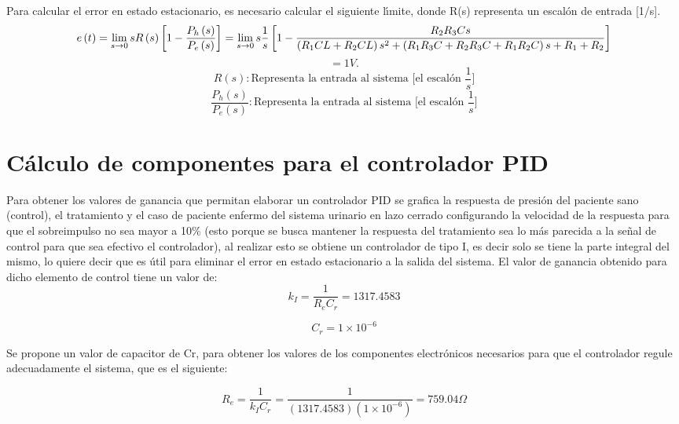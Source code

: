 \documentclass[letterpaper,11pt]{article}
\begin{document}
Para calcular el error en estado estacionario, es necesario calcular el
siguiente l\'{\i}mite, donde R(s) representa un escal\'{o}n de entrada [1/s].%
\begin{equation*}
e\left( t\right) =\lim_{s\rightarrow 0}sR\left( s\right) \left[ 1-\dfrac{%
P_{h}\left( s\right) }{P_{e}\left( s\right) }\right] =\lim_{s\rightarrow 0}s%
\frac{1}{s}\left[ 1-\frac{R_{2}R_{3}Cs}{\left( R_{1}CL+R_{2}CL\right)
s^{2}+\left( R_{1}R_{3}C+R_{2}R_{3}C+R_{1}R_{2}C\right) s+R_{1}+R_{2}}\right]
\end{equation*}%
\begin{equation*}
=1V.
\end{equation*}%
\begin{equation*}
R(s):\text{Representa la entrada al sistema [el escal\'{o}n }\frac{1}{s}%
\text{]}
\end{equation*}%
\begin{equation*}
\dfrac{P_{h}\left( s\right) }{P_{e}\left( s\right) }:\text{Representa la
entrada al sistema [el escal\'{o}n }\frac{1}{s}\text{]}
\end{equation*}

\section{C\'{a}lculo de componentes para el controlador PID}

Para obtener los valores de ganancia que permitan elaborar un controlador
PID se grafica la respuesta de presi\'{o}n del paciente sano (control), el
tratamiento y el caso de paciente enfermo del sistema urinario en lazo
cerrado configurando la velocidad de la respuesta para que el sobreimpulso
no sea mayor a 10\% (esto porque se busca mantener la respuesta del
tratamiento sea lo m\'{a}s parecida a la se\~{n}al de control para que sea
efectivo el controlador), al realizar esto se obtiene un controlador de tipo
I, es decir solo se tiene la parte integral del mismo, lo quiere decir que
es \'{u}til para eliminar el error en estado estacionario a la salida del
sistema. El valor de ganancia obtenido para dicho elemento de control tiene
un valor de:%
\begin{equation*}
k_{I}=\frac{1}{R_{e}C_{r}}=1317.4583
\end{equation*}

\begin{equation*}
C_{r}=1\times 10^{-6}
\end{equation*}

Se propone un valor de capacitor de Cr, para obtener los valores de los
componentes electr\'{o}nicos necesarios para que el controlador regule
adecuadamente el sistema, que es el siguiente:

\begin{equation*}
R_{e}=\frac{1}{k_{I}C_{r}}=\frac{1}{(1317.4583)(1\times 10^{-6})}%
=759.04\Omega 
\end{equation*}
\end{document}
